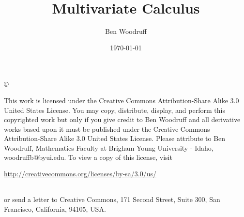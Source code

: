 \documentclass[letterpaper,oneside]{book}%
\theoremstyle{plain}
\theoremstyle{box}
\theoremstyle{problem}
\begin{document}
\frontmatter
\title{Multivariate Calculus}
\author{Ben Woodruff}
\date{\today}
\maketitle
\copyright{This work is licensed under the Creative Commons Attribution-Share Alike 3.0 United States License.  You may copy, distribute, display, and perform this copyrighted work but only if you give credit to Ben Woodruff and all derivative works based upon it must be published under the Creative Commons Attribution-Share Alike 3.0 United States License. Please attribute to Ben Woodruff, Mathematics Faculty at Brigham Young University - Idaho, woodruffb@byui.edu.  To view a copy of this license, visit\\ \centerline{\url{http://creativecommons.org/licenses/by-sa/3.0/us/}} \\ or send a letter to Creative Commons, 171 Second Street, Suite 300, San Francisco, California, 94105, USA.}
\tableofcontents

%

%

\end{document}
